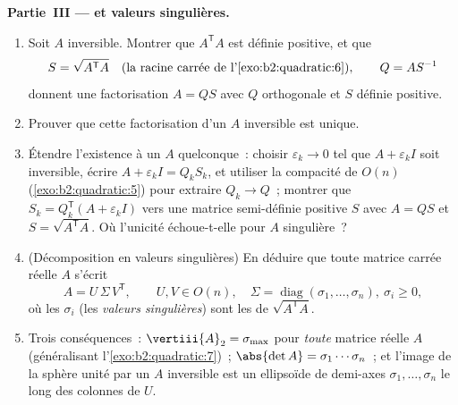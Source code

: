 \begin{problem}
\medskip
\noindent\textbf{Partie~III ---  et valeurs
singulières.}
\begin{enumerate}[resume]
  \item Soit $A$ inversible. Montrer que $A^{\mathsf T}A$ est
        définie positive, et que
        \[
        S = \sqrt{A^{\mathsf T}A}
        \quad\text{(la racine carrée de l'\cref{exo:b2:quadratic:6})},
        \qquad Q = AS^{-1}
        \]
        donnent une factorisation $A = QS$ avec $Q$ orthogonale et
        $S$ définie positive.
  \item Prouver que cette factorisation d'un $A$ inversible est
        unique.
  \item Étendre l'existence à un $A$ quelconque~: choisir
        $\varepsilon_k \to 0$ tel que $A + \varepsilon_k I$ soit
        inversible, écrire $A + \varepsilon_kI = Q_kS_k$, et
        utiliser la compacité de $O(n)$
        (\cref{exo:b2:quadratic:5}) pour extraire $Q_k \to Q$~;
        montrer que $S_k = Q_k^{\mathsf T}(A + \varepsilon_kI)$
         vers une matrice semi-définie positive $S$ avec $A
        = QS$ et $S = \sqrt{A^{\mathsf T}A}$. Où l'unicité
        échoue-t-elle pour $A$ singulière~?
  \item (Décomposition en valeurs singulières) En déduire que toute
        matrice carrée réelle $A$ s'écrit
        \[
        A = U\,\Sigma\,V^{\mathsf T},
        \qquad U, V \in O(n),\quad
        \Sigma = \operatorname{diag}(\sigma_1, \dots,
        \sigma_n),\ \sigma_i \geq 0 ,
        \]
        où les $\sigma_i$ (les \emph{valeurs singulières}) sont
        les  de $\sqrt{A^{\mathsf T}A}$.
  \item Trois conséquences~: $\vertiii{A}_2 = \sigma_{\max}$ pour
        \emph{toute} matrice réelle $A$ (généralisant
        l'\cref{exo:b2:quadratic:7})~; $\abs{\det A} =
        \sigma_1\cdots\sigma_n$~; et l'image de la sphère unité par
        un $A$ inversible est un ellipsoïde de demi-axes
        $\sigma_1, \dots, \sigma_n$ le long des colonnes de $U$.
\end{enumerate}


\end{problem}

